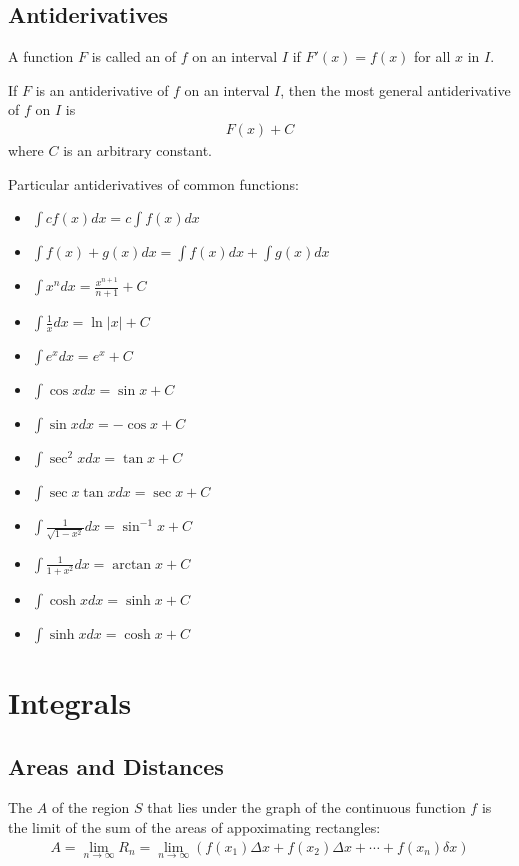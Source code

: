 \documentclass{article}
\begin{document}
\subsection{Antiderivatives}
\begin{definition}
    A function $F$ is called an  of $f$ on an interval $I$ if $F'(x)=f(x)$ for all $x$ in $I$.
\end{definition}
\begin{theorem}
    If $F$ is an antiderivative of $f$ on an interval $I$, then the most general antiderivative of $f$ on $I$ is
    \begin{align*}
        F(x) + C
    \end{align*}
    where $C$ is an arbitrary constant.
\end{theorem}
\begin{theorem}
    Particular antiderivatives of common functions:
    \begin{itemize}
        \item $\int cf(x)dx = c\int f(x)dx$
        \item $\int f(x) + g(x) dx = \int f(x)dx + \int g(x)dx$
        \item $\int x^n dx=\frac{x^{n+1}}{n+1}+C$
        \item $\int \frac{1}{x}dx=\ln |x|+C$
        \item $\int e^xdx=e^x+C$
        \item $\int \cos x dx = \sin x+C$
        \item $\int \sin x dx = -\cos x +C $
        \item $\int \sec^2 x dx = \tan x + C$
        \item $\int \sec x \tan x dx = \sec x + C$
        \item $\int \frac{1}{\sqrt{1-x^2}}dx = \sin^{-1} x + C$
        \item $\int \frac{1}{1+x^2}dx = \arctan x + C$
        \item $\int \cosh x dx = \sinh x + C$
        \item $\int \sinh x dx = \cosh x + C$
    \end{itemize}
\end{theorem}
\section{Integrals}
\subsection{Areas and Distances}
\begin{definition}
  The  $A$ of the region $S$ that lies under the graph of the continuous function $f$ is the limit of the sum of the areas of appoximating rectangles:
  \begin{align*}
      A=\lim_{n\to\infty}R_n = \lim_{n\to \infty}\left(f(x_1)\Delta x + f(x_2)\Delta x + \cdots + f(x_n)\delta x\right)
  \end{align*}
\end{definition}
\end{document}
